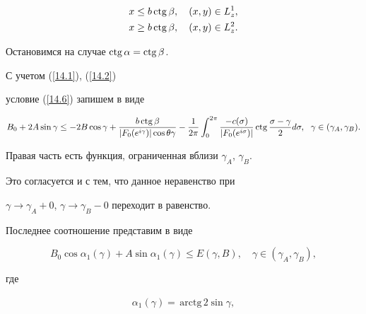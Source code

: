 {\begin{equation}
\begin{split}
x&\leq b\ctg \beta,\quad (x,y)\in L_{z}^{1}, \\


x&\geq b\ctg \beta,\quad (x,y)\in L_{z}^{2}.


\end{split}


\end{equation}





Остановимся на случае $\operatorname{ctg} \alpha =\operatorname{ctg} \beta$.


С учетом (\ref{14.1}), (\ref{14.2})


условие (\ref{14.6}) запишем в виде


$$


B_{0}+2A\sin\gamma\leq -2B\cos\gamma +\frac{b\ctg \beta}


{|F_{0}(e^{i\gamma})|\cos\theta\gamma}-


\frac{1}{2\pi}


\int_{0}^{2\pi}\frac{-c(\sigma)}{|F_{0}(e^{i\sigma})|}


\ctg \frac{\sigma -\gamma}{2}d\sigma,\ \; \gamma\in


(\gamma_{A},\gamma_{B}).


$$


Правая часть есть функция, ограниченная вблизи $\gamma_{A}$, $\gamma_{B}$.


Это согласуется и с тем, что данное неравенство при


$\gamma\to\gamma_{A}+0$, $\gamma\to\gamma_{B}-0$ переходит в равенство.





Последнее соотношение представим в виде


\begin{equation}\label{17.6}


B_{0}\cos\alpha_{1}(\gamma)+A\sin\alpha_{1}(\gamma)\leq E(\gamma,B),


\quad\gamma\in (\gamma_{A},\gamma_{B}),


\end{equation}


где


\begin{gather*}




\alpha_{1}(\gamma)=\,\mathrm{arctg}\,2\sin\gamma,\\



\end{gather*}}
